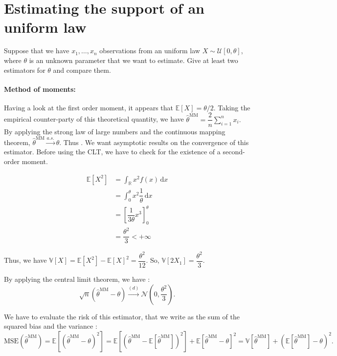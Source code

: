 \section{Estimating the support of an uniform law}

\begin{tcolorbox}[width=\linewidth, sharp corners=all, colback=white!95!black]
Suppose that we have $x_1,\dots,x_n$ observations from an uniform law $X \sim \mathcal{U}[0,\theta]$, where $\theta$ is an unknown parameter that we want to estimate. Give at least two estimators for $\theta$ and compare them.
\end{tcolorbox}

\paragraph*{Method of moments:}

Having a look at the first order moment, it appears that $\mathbb{E}[X] = \theta/2$. Taking the empirical counter-party of this theoretical quantity, we have $\boxed{\hat{\theta}^{\text{MM}} = \dfrac{2}{n}\sum\limits_{i=1}^n x_i.}$\newline
By applying the strong law of large numbers and the continuous mapping theorem, $\hat{\theta}^{\text{MM}} \xrightarrow{a.s.} \theta$. Thus .\newline
We want asymptotic results on the convergence of this estimator. Before using the CLT, we have to check for the existence of a second-order moment.

\begin{align*}
    \mathbb{E}[X^2] &= \displaystyle \int_{\mathbb{R}} x^2 f(x) \, \mathrm{d}x \\
    &= \displaystyle \int_{0}^{\theta} x^2 \dfrac{1}{\theta} \, \mathrm{d}x \\
    &= \left[ \dfrac{1}{3\theta}x^3 \right]^\theta_0 \\
    &= \dfrac{\theta^2}{3} < +\infty
\end{align*}

Thus, we have $\mathbb{V}[X] = \mathbb{E}[X^2] - \mathbb{E}[X]^2 = \dfrac{\theta^2}{12}$. So, $\mathbb{V}[2X_1]  = \dfrac{\theta^2}{3}$.\newline

By applying the central limit theorem, we have : $$\sqrt{n}(\hat{\theta}^{\text{MM}} - \theta) \xrightarrow{(d)} \mathcal{N}\left(0, \dfrac{\theta^2}{3}\right).$$

We have to evaluate the risk of this estimator, that we write as the sum of the squared bias and the variance : $$\text{MSE}(\hat{\theta}^{\text{MM}}) = \mathbb{E}[(\hat{\theta}^{\text{MM}} - \theta)^2] = \mathbb{E}[(\hat{\theta}^{\text{MM}} - \mathbb{E}[\hat{\theta}^{\text{MM}}])^2] + \mathbb{E}[\hat{\theta}^{\text{MM}} - \theta]^2 = \mathbb{V}[\hat{\theta}^{\text{MM}}] + (\mathbb{E}[\hat{\theta}^{\text{MM}}] - \theta)^2.$$

